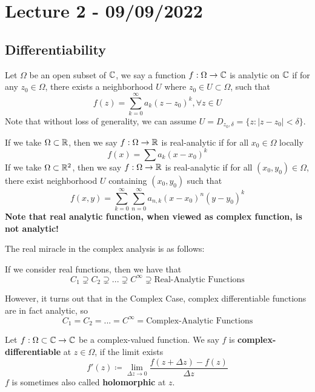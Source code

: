 \section{Lecture 2 - 09/09/2022}

\subsection{Differentiability}

\begin{definition}
Let $\Omega$ be an open subset of $\mathbb{C}$, we say a function $f: \Omega \to \mathbb{C}$ is analytic on $\mathbb{C}$ if for any $z_0 \in \Omega$, there exists a neighborhood $U$ where $z_0 \in U \subset \Omega$, such that
\[f(z) = \sum_{k = 0}^\infty a_k (z - z_0)^k, \forall z \in U\]
Note that without loss of generality, we can assume $U = D_{z_0, \delta} = \{z: |z - z_0| < \delta\}$.
\end{definition}

\begin{remark}
    If we take $\Omega \subset \mathbb{R}$, then we say $f: \Omega \to \mathbb{R}$ is real-analytic if for all $x_0 \in \Omega$ locally
    \[f(x) = \sum a_k (x - x_0)^k\]
    If we take $\Omega \subset \mathbb{R}^2$, then we say $f: \Omega \to \mathbb{R}$ is real-analytic if for all $(x_0, y_0) \in \Omega$, there exist neighborhood $U$ containing $(x_0, y_0)$ such that
    \[f(x, y) = \sum_{k = 0}^\infty \sum_{n = 0}^\infty a_{n, k} (x - x_0)^n (y - y_0)^k\]
    \textbf{Note that real analytic function, when viewed as complex function, is not analytic!}
\end{remark}

The real miracle in the complex analysis is as follows:

If we consider real functions, then we have that
\[C_1 \supsetneq C_2 \supsetneq ... \supsetneq C^\infty \supsetneq \text{Real-Analytic Functions}\]

However, it turns out that in the Complex Case, complex differentiable functions are in fact analytic, so
\[C_1 = C_2 = ... = C^\infty = \text{Complex-Analytic Functions}\]


\begin{definition}
Let $f: \Omega \subset \mathbb{C} \to \mathbb{C}$ be a complex-valued function. We say $f$ is \textbf{complex-differentiable} at $z \in \Omega$, if the limit exists
\[f'(z) \coloneqq \lim_{\Delta z \to 0} \frac{f(z + \Delta z) - f(z)}{\Delta z}\]
$f$ is sometimes also called \textbf{holomorphic} at $z$.
\end{definition}

